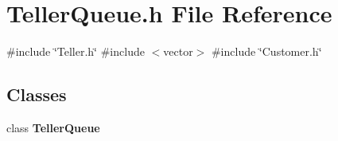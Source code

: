 \section{Teller\+Queue.\+h File Reference}
\label{TellerQueue_8h}
{\ttfamily \#include \char`\"{}Teller.\+h\char`\"{}}\newline
{\ttfamily \#include $<$vector$>$}\newline
{\ttfamily \#include \char`\"{}Customer.\+h\char`\"{}}\newline
\subsection*{Classes}
\begin{DoxyCompactItemize}
\item 
class \textbf{ Teller\+Queue}
\end{DoxyCompactItemize}
